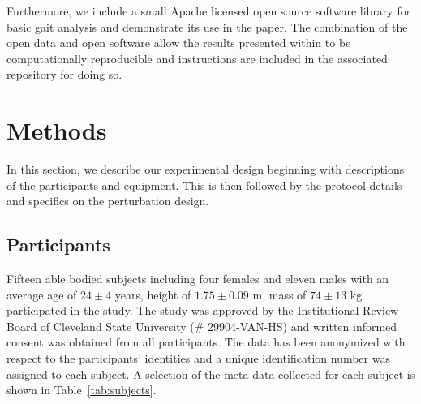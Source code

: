 \documentclass[fleqn,12pt]{wlpeerj}
\begin{document}
Furthermore, we include a small Apache licensed open source software library
for basic gait analysis and demonstrate its use in the paper. The combination
of the open data and open software allow the results presented within to be
computationally reproducible and instructions are included in the associated
repository for doing so.

\section*{Methods}
%
In this section, we describe our experimental design beginning with
descriptions of the participants and equipment. This is then followed by the
protocol details and specifics on the perturbation design.

\subsection*{Participants}
%
Fifteen able bodied subjects including four females and eleven males with an
average age of $24\pm4$ years, height of $1.75\pm0.09$ m, mass of $74\pm13$ kg
participated in the study. The study was approved by the Institutional Review
Board of Cleveland State University (\# 29904-VAN-HS) and written informed
consent was obtained from all participants. The data has been anonymized with
respect to the participants' identities and a unique identification number was
assigned to each subject. A selection of the meta data collected for each
subject is shown in Table~\ref{tab:subjects}.
%
\begin{table}
  \cprotect\caption{Information about the 15 study participants. The final
    three columns provide the trial numbers associated with each nominal
    treadmill speed. The measured mass is computed from the mean total vertical
    ground reaction force just after the calibration pose event, if possible.
    If the mass is reported without an accompanying standard deviation, it is
    the subject's self-reported mass. Additional trials found in the data set
    with a subject identification number 0 are trials with no subject, i.e.
    unloaded trials that can be used for inertial compensation purposes, and
    are not shown in the table. Generated by \verb|src/subject_table.py|.}
  \centering
  \small
  
  \label{tab:subjects}
\end{table}
\end{document}
